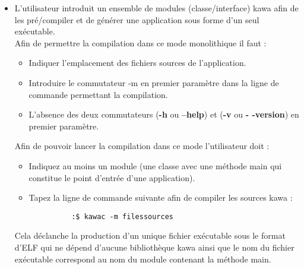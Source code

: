 \documentclass{../res/univ-projet}
\begin{document}
    \begin{itemize}
      \item L’utilisateur introduit un ensemble de modules (classe/interface)
      kawa afin de les pré/compiler et de générer une application sous forme
      d’un seul exécutable.\\

      Afin de permettre la compilation dans ce mode monolithique il faut :
      \begin{itemize}
        \item Indiquer l’emplacement des fichiers sources de l’application.
        \item Introduire le commutateur -m en premier paramètre dans la
        ligne de commande permettant la compilation.
        \item L’absence des deux commutateurs (\textbf{-h} ou \textbf{--help}) et (\textbf{-v} ou \textbf{-
        -version}) en premier paramètre.
        
      \end{itemize}

      Afin de pouvoir lancer la compilation dans ce mode l’utilisateur doit :
      \begin{itemize}
        \item Indiquez au moins un module (une classe avec une méthode
        main qui constitue le point d’entrée d’une application).
        \item Tapez la ligne de commande suivante afin de compiler les sources kawa :\\
        \begin{verbatim}
          :$ kawac -m filessources
        \end{verbatim}
        
        
      \end{itemize}

      Cela déclanche la production d’un unique fichier exécutable sous le format
      d’ELF qui ne dépend d’aucune bibliothèque kawa ainsi que le nom du fichier 
      exécutable correspond au nom du module contenant la méthode main.\\


\end{itemize}
\end{document}
